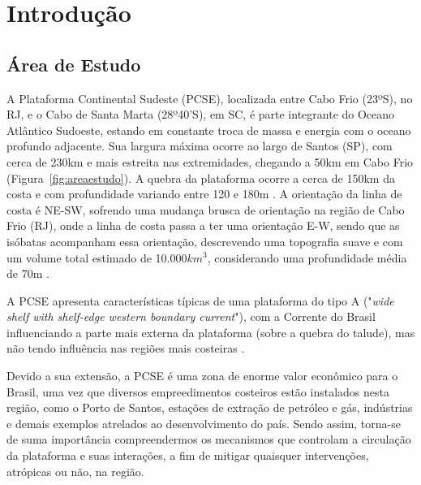 \chapter{Introdução}

\section{Área de Estudo}
\label{sec:studyArea}

\hspace{5mm}A Plataforma Continental Sudeste (PCSE), localizada entre Cabo Frio (23ºS), no RJ, e o Cabo de Santa Marta (28º40'S), em SC, é parte integrante do Oceano Atlântico Sudoeste,
estando em constante troca de massa e energia com o oceano profundo adjacente. Sua largura máxima ocorre ao largo de Santos (SP), com cerca de 230km e mais estreita nas extremidades,
chegando a 50km em Cabo Frio (Figura~\ref{fig:areaestudo}). A quebra da plataforma ocorre a cerca de 150km da costa e com profundidade variando entre 120 e 180m \citep{zembruscki1979geomorfologia}. A orientação da linha de costa é NE-SW, sofrendo uma mudança brusca de orientação na região de Cabo Frio (RJ), onde a linha de costa passa a ter uma orientação E-W, sendo que as isóbatas acompanham essa orientação, descrevendo uma topografia suave e com um volume total estimado de 10.000$km^3$, considerando uma profundidade média de 70m \citep{castro1996correntes}.

\hspace{5mm} A PCSE apresenta características típicas de uma plataforma do tipo A ("\textit{wide shelf with shelf-edge western boundary current}"), com a Corrente do Brasil influenciando a parte mais externa da plataforma (sobre a quebra do talude), mas não tendo influência nas regiões mais costeiras \citep{castro2014summer,loder1998western}.

\hspace{5mm} Devido a sua extensão, a PCSE é uma zona de enorme valor econômico para o Brasil, uma vez que diversos empreedimentos costeiros estão instalados nesta região, como o Porto de Santos, estações de extração de petróleo e gás, indústrias e demais exemplos atrelados ao desenvolvimento do país. Sendo assim, torna-se de suma importância compreendermos os mecanismos que controlam a circulação da plataforma e suas interações, a fim de mitigar quaisquer intervenções, atrópicas ou não, na região.

